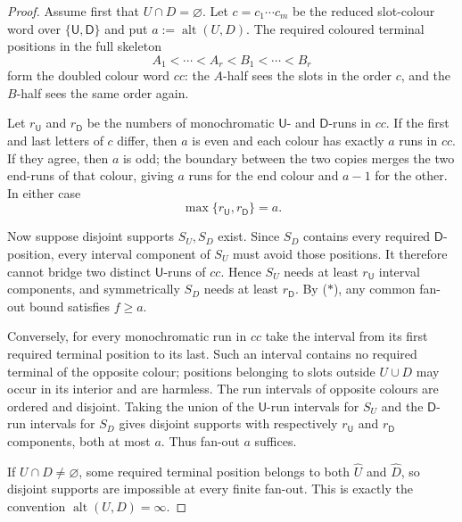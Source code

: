 \documentclass[11pt]{article}
\begin{document}
\begin{proof}
Assume first that $U\cap D=\varnothing$.  Let $c=c_1\cdots c_m$ be the reduced
slot-colour word over $\{\mathsf U,\mathsf D\}$ and put
$a:=\operatorname{alt}(U,D)$.  The required coloured terminal positions in the
full skeleton
\[
 A_1<\cdots<A_r<B_1<\cdots<B_r
\]
form the doubled colour word $cc$: the $A$-half sees the slots in the order
$c$, and the $B$-half sees the same order again.

Let $r_{\mathsf U}$ and $r_{\mathsf D}$ be the numbers of monochromatic
$\mathsf U$- and $\mathsf D$-runs in $cc$.  If the first and last letters of
$c$ differ, then $a$ is even and each colour has exactly $a$ runs in $cc$.  If
they agree, then $a$ is odd; the boundary between the two copies merges the
two end-runs of that colour, giving $a$ runs for the end colour and $a-1$ for
the other.  In either case
\[
 \max\{r_{\mathsf U},r_{\mathsf D}\}=a.                 \tag{$\ast$}
\]

Now suppose disjoint supports $S_U,S_D$ exist.  Since $S_D$ contains every
required $\mathsf D$-position, every interval component of $S_U$ must avoid
those positions.  It therefore cannot bridge two distinct
$\mathsf U$-runs of $cc$.  Hence $S_U$ needs at least
$r_{\mathsf U}$ interval components, and symmetrically $S_D$ needs at least
$r_{\mathsf D}$.  By ($\ast$), any common fan-out bound satisfies
$f\ge a$.

Conversely, for every monochromatic run in $cc$ take the interval from its
first required terminal position to its last.  Such an interval contains no
required terminal of the opposite colour; positions belonging to slots outside
$U\cup D$ may occur in its interior and are harmless.  The run intervals of
opposite colours are ordered and disjoint.  Taking the union of the
$\mathsf U$-run intervals for $S_U$ and the $\mathsf D$-run intervals for
$S_D$ gives disjoint supports with respectively
$r_{\mathsf U}$ and $r_{\mathsf D}$ components, both at most $a$.  Thus
fan-out $a$ suffices.

If $U\cap D\ne\varnothing$, some required terminal position belongs to both
$\widehat U$ and $\widehat D$, so disjoint supports are impossible at every
finite fan-out.  This is exactly the convention
$\operatorname{alt}(U,D)=\infty$.
\end{proof}
\end{document}
